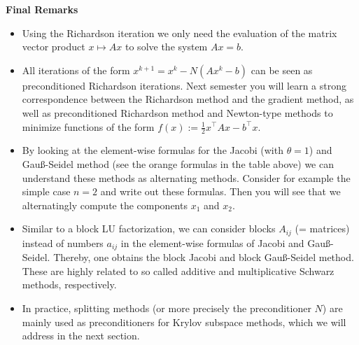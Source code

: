 \begin{frame}
\textbf{Final Remarks}
	\begin{itemize}
		\item Using the Richardson iteration we only need the evaluation of the matrix vector product $x \mapsto Ax$ to solve the system $Ax=b$.
		\item All iterations of the form $x^{k+1}= x^k - N(Ax^k-b)$ can be seen as preconditioned Richardson iterations. Next semester you will learn a strong correspondence between the Richardson method and the gradient method, as well as preconditioned Richardson method and Newton-type methods to minimize functions of the form $f(x):=\frac{1}{2}x^\top Ax-b^\top x$.
		\item By looking at the element-wise formulas for the Jacobi (with $\theta = 1$) and Gauß-Seidel method (see the orange formulas in the table above) we can understand these methods as alternating methods. Consider for example the simple case $n=2$ and write out these formulas. Then you will see that we alternatingly compute the components $x_1$ and $x_2$.
		\item Similar to a block LU factorization, we can consider blocks $A_{ij}$ (= matrices) instead of numbers $a_{ij}$ in the element-wise formulas of Jacobi and Gauß-Seidel. Thereby, one obtains the block Jacobi and block Gauß-Seidel method. These are highly related to so called additive and multiplicative Schwarz methods, respectively.
		\item In practice, splitting methods (or more precisely the preconditioner $N$) are mainly used as preconditioners for Krylov subspace methods, which we will address in the next section.
	\end{itemize}
\end{frame}







